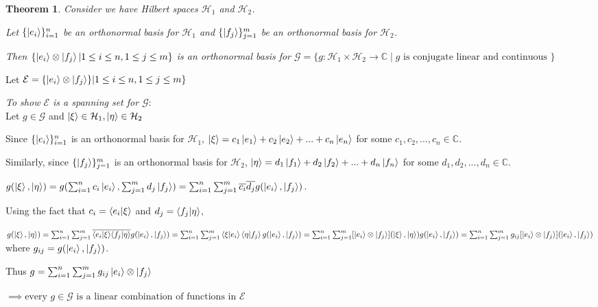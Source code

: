 \documentclass[12pt,twoside,fleqn]{report}
\makeatletter
\theoremstyle{thmstyle}
\renewenvironment{proof}[1][\proofname]{\par
\pushQED{\qed}%
\normalfont \topsep6\p@\@plus6\p@\relax
\trivlist
\item[\hskip\labelsep\itshape#1\@addpunct{.}]\mbox{}\par\nobreak\ignorespaces
}{%
    \popQED\endtrivlist\@endpefalse
    }
\newtheorem{thm}{Theorem}[chapter]
\makeatother
\begin{document}
\begin{thm}
    Consider we have Hilbert spaces $\mathcal{H}_1$ and $\mathcal{H}_2$.

    Let $\{ \ket{e_i} \}_{i=1}^n$ be an orthonormal basis for $\mathcal{H}_1$ and $\{ \ket{f_j} \}_{j=1}^m$ be an orthonormal basis for $\mathcal{H}_2$.

    Then $\{ \ket{e_i} \otimes \ket{f_j} | 1 \leq i \leq n, 1 \leq j \leq m \}$ is an orthonormal basis for $\mathcal{G} = \{ g: \mathcal{H}_1 \times \mathcal{H}_2 \to \mathbb{C} \; | \; g \text{ is conjugate linear and continuous } \}$
\end{thm}
\begin{proof}
    Let $\mathcal{E} = \{ \ket{e_i} \otimes \ket{f_j} \} | 1 \leq i \leq n, 1 \leq j \leq m \}$

    \emph{To show $\mathcal{E}$ is a spanning set for $\mathcal{G}:$} \\

    Let $g \in \mathcal{G}$ and $\ket{\xi} \in \mathcal{H}_1, \ket{\eta} \in \mathcal{H}_2$

    Since $\{ \ket{e_i} \}_{i = 1}^n$ is an orthonormal basis for $\mathcal{H}_1$, $\ket{\xi} = c_1 \ket{e_1} + c_2 \ket{e_2} + ... + c_n \ket{e_n}$ for some $c_1, c_2, ..., c_n \in \mathbb{C}$.

    Similarly, since $\{ \ket{f_j} \}_{j = 1}^m$ is an orthonormal basis for $\mathcal{H}_2$, $\ket{\eta} = d_1 \ket{f_1} + d_2 \ket{f_2} + ... + d_n \ket{f_n}$ for some $d_1, d_2, ..., d_n \in \mathbb{C}$.

    $g(\ket{\xi}, \ket{\eta}) = g(\sum_{i=1}^n c_i \ket{e_i}, \sum_{j=1}^m d_j \ket{f_j}) = \sum_{i=1}^n \sum_{j=1}^m \overline{c_i} \overline{d_j} g(\ket{e_i}, \ket{f_j})$.

    Using the fact that $c_i = \braket{e_i|\xi}$ and $d_j = \braket{f_j|\eta}$,

     $g(\ket{\xi}, \ket{\eta}) = \sum_{i=1}^n \sum_{j=1}^m \overline{\braket{e_i|\xi}} \overline{\braket{f_j|\eta}} g(\ket{e_i}, \ket{f_j}) = \sum_{i=1}^n \sum_{j=1}^m \braket{\xi|e_i} \braket{\eta|f_j}g(\ket{e_i}, \ket{f_j}) = \sum_{i=1}^n \sum_{j=1}^m [\ket{e_i} \otimes \ket{f_j}](\ket{\xi}, \ket{\eta}) g(\ket{e_i}, \ket{f_j}) = \sum_{i=1}^n \sum_{j=1}^m g_{ij} [\ket{e_i} \otimes \ket{f_j}](\ket{e_i}, \ket{f_j})$ where $g_{ij} = g(\ket{e_i}, \ket{f_j})$.

     Thus $g = \sum_{i=1}^n \sum_{j=1}^m g_{ij} \ket{e_i} \otimes \ket{f_j}$

     $\implies \text{every } g \in \mathcal{G} \text{ is a linear combination of functions in } \mathcal{E}$


\end{proof}
\end{document}
